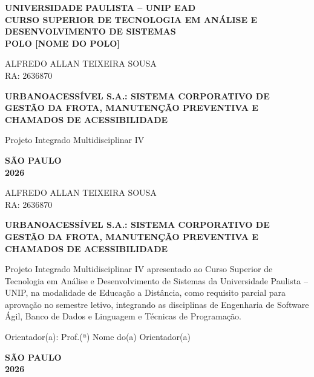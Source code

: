 \documentclass[12pt,a4paper,oneside]{report}
\newcommand{\instituicao}{UNIVERSIDADE PAULISTA -- UNIP EAD}
\newcommand{\polo}{POLO [NOME DO POLO]}
\newcommand{\curso}{CURSO SUPERIOR DE TECNOLOGIA EM ANÁLISE E DESENVOLVIMENTO DE SISTEMAS}
\newcommand{\autores}{%
  ALFREDO ALLAN TEIXEIRA SOUSA\\RA: 2636870}
\newcommand{\titulo}{URBANOACESSÍVEL S.A.: SISTEMA CORPORATIVO DE GESTÃO DA FROTA, MANUTENÇÃO PREVENTIVA E CHAMADOS DE ACESSIBILIDADE}
\newcommand{\subtitulo}{Projeto Integrado Multidisciplinar IV}
\newcommand{\orientador}{Prof.(ª) Nome do(a) Orientador(a)}
\newcommand{\cidade}{SÃO PAULO}
\newcommand{\ano}{2026}
\begin{document}
\begin{titlepage}
  \thispagestyle{empty}
  \centering\bfseries
  \instituicao\\[2pt]\curso\\[2pt]\polo\par
  \vspace{2.5cm}
  \normalfont\autores\par
  \vfill
  \bfseries\titulo\par
  \vspace{0.5cm}\normalfont\subtitulo\par
  \vfill
  \bfseries\cidade\\\ano
\end{titlepage}

\setcounter{page}{1}
\thispagestyle{empty}
\begin{center}
  \autores\par
  \vspace{4cm}
  \textbf{\titulo}\par
  \vspace{2cm}
\end{center}
\begin{flushright}
  \begin{minipage}{0.5\textwidth}
    \singlespacing\small
    Projeto Integrado Multidisciplinar IV apresentado ao Curso Superior de Tecnologia em Análise e
    Desenvolvimento de Sistemas da Universidade Paulista -- UNIP, na modalidade de Educação a Distância, como requisito parcial para
    aprovação no semestre letivo, integrando as disciplinas de Engenharia de Software Ágil,
    Banco de Dados e Linguagem e Técnicas de Programação.\par\vspace{0.8cm}
    Orientador(a): \orientador
  \end{minipage}
\end{flushright}
\vfill
\begin{center}\textbf{\cidade\\\ano}\end{center}
\clearpage
\end{document}
